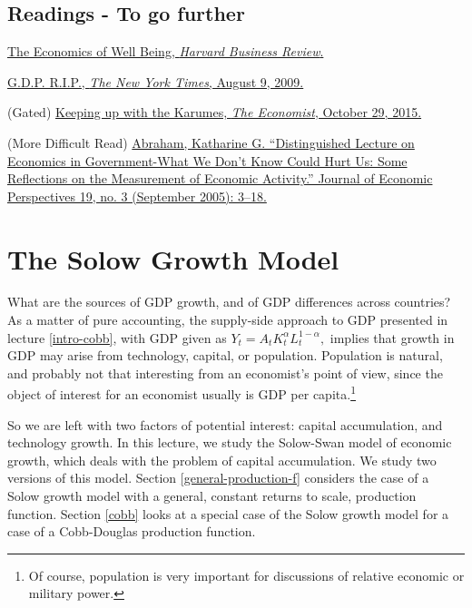 \documentclass[]{book}
\let\rmarkdownfootnote\footnote%
\def\footnote{\protect\rmarkdownfootnote}
\theoremstyle{definition}
\theoremstyle{definition}
\theoremstyle{definition}
\theoremstyle{remark}
\begin{document}
\section*{Readings - To go further}\label{readings---to-go-further}

\href{https://hbr.org/2012/01/the-economics-of-well-being}{The Economics
of Well Being, \emph{Harvard Business Review}.}

\href{https://search.proquest.com/hnpnewyorktimes/docview/1030670685/A9EF0C9A254D4699PQ/1?accountid=14512}{G.D.P.
R.I.P., \emph{The New York Times}, August 9, 2009.}

(Gated)
\href{https://www.economist.com/news/finance-and-economics/21677223-new-study-shows-money-can-buy-you-happinessbut-only-fleetingly-others}{Keeping
up with the Karumes, \emph{The Economist}, October 29, 2015.}

(More Difficult Read)
\href{https://doi.org/10.1257/089533005774357833}{Abraham, Katharine G.
``Distinguished Lecture on Economics in Government-What We Don't Know
Could Hurt Us: Some Reflections on the Measurement of Economic
Activity.'' Journal of Economic Perspectives 19, no. 3 (September 2005):
3--18.}

\hypertarget{solow}{\chapter{The Solow Growth Model}\label{solow}}

What are the sources of GDP growth, and of GDP differences across
countries? As a matter of pure accounting, the supply-side approach to
GDP presented in lecture \ref{intro-cobb}, with GDP given as
\(Y_t = A_t K_t^{\alpha} L_t^{1-\alpha},\) implies that growth in GDP
may arise from technology, capital, or population. Population is
natural, and probably not that interesting from an economist's point of
view, since the object of interest for an economist usually is GDP per
capita.\footnote{Of course, population is very important for discussions
  of relative economic or military power.}

So we are left with two factors of potential interest: capital
accumulation, and technology growth. In this lecture, we study the
Solow-Swan model of economic growth, which deals with the problem of
capital accumulation. We study two versions of this model. Section
\ref{general-production-f} considers the case of a Solow growth model
with a general, constant returns to scale, production function. Section
\ref{cobb} looks at a special case of the Solow growth model for a case
of a Cobb-Douglas production function.
\end{document}
